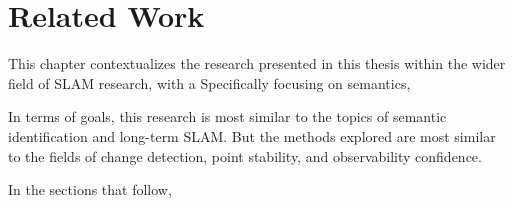 \section{Related Work}
\label{sec:related_work}

This chapter contextualizes the research presented in this thesis within the wider field of SLAM research, with a Specifically focusing on semantics,

In terms of goals, this research is most similar to the topics of semantic identification and long-term SLAM. But the methods explored are most similar to the fields of change detection, point stability, and observability confidence.

In the sections that follow,
% 